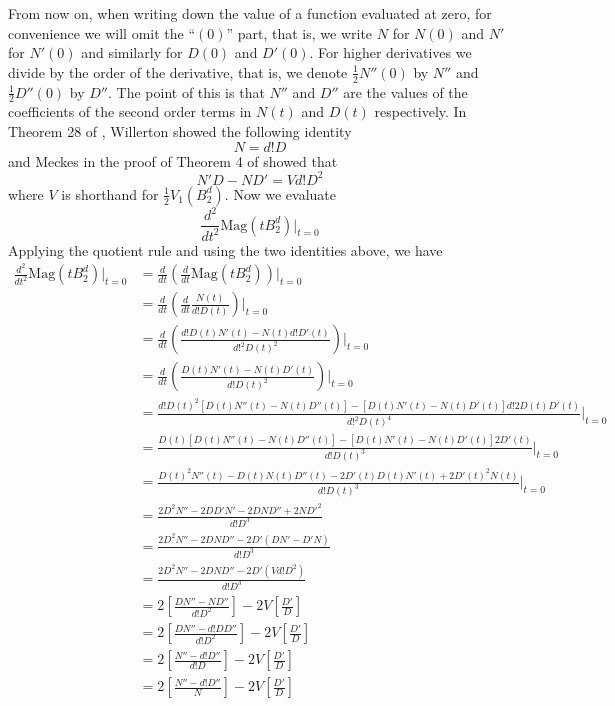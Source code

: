 \documentclass[11pt]{article}
\theoremstyle{definition}
\theoremstyle{definition}
\theoremstyle{plain}
\theoremstyle{plain}
\theoremstyle{plain}
\theoremstyle{definition}
\begin{document}
From now on, when writing down the value of a function evaluated at zero, for convenience we will omit the ``$(0)$'' part, that is, we write $N$ for $N(0)$ and $N'$ for $N'(0)$ and similarly for $D(0)$ and $D'(0)$. For higher derivatives we divide by the order of the derivative, that is, we denote $\frac{1}{2}N''(0)$ by $N''$ and $\frac{1}{2}D''(0)$ by $D''$. The point of this is that $N''$ and $D''$ are the values of the coefficients of the second order terms in $N(t)$ and $D(t)$ respectively. In Theorem 28 of \cite{willerton_magnitude_2017}, Willerton showed the following identity
\begin{equation*}
N = d!D
\end{equation*}
and Meckes in the proof of Theorem 4 of \cite{meckes_magnitude_2019} showed that
\begin{equation*}
N'D - ND' = Vd!D^2
\end{equation*}
where $V$ is shorthand for $\frac{1}{2}V_1\left(B_2^d\right)$. Now we evaluate
\begin{equation*}
\frac{d^2}{dt^2}\text{Mag}(tB_2^d)\big\vert_{t=0}
\end{equation*}
Applying the quotient rule and using the two identities above, we have
\begin{align*}
\frac{d^2}{dt^2}\text{Mag}(tB_2^d)\big\vert_{t=0} &= \frac{d}{dt}\left(\frac{d}{dt}\text{Mag}(tB_2^d)\right)\big\vert_{t=0} \\
&= \frac{d}{dt}\left(\frac{d}{dt}\frac{N(t)}{d!D(t)}\right)\big\vert_{t=0} \\
&= \frac{d}{dt}\left(\frac{d!D(t)N'(t)-N(t)d!D'(t)}{d!^2D(t)^2}\right)\big\vert_{t=0} \\
&= \frac{d}{dt}\left(\frac{D(t)N'(t)-N(t)D'(t)}{d!D(t)^2}\right)\big\vert_{t=0} \\
&= \frac{d!D(t)^2[D(t)N''(t)-N(t)D''(t)]-[D(t)N'(t)-N(t)D'(t)]d!2D(t)D'(t)}{d!^2D(t)^4}\big\vert_{t=0} \\
&= \frac{D(t)[D(t)N''(t)-N(t)D''(t)]-[D(t)N'(t)-N(t)D'(t)]2D'(t)}{d!D(t)^3}\big\vert_{t=0} \\
&= \frac{D(t)^2N''(t)-D(t)N(t)D''(t)-2D'(t)D(t)N'(t)+2D'(t)^2N(t)}{d!D(t)^3}\big\vert_{t=0} \\
&= \frac{2D^2N''-2DD'N'-2DND''+2ND'^2}{d!D^3} \\
&= \frac{2D^2N''-2DND''-2D'(DN'-D'N)}{d!D^3} \\
&= \frac{2D^2N''-2DND''-2D'(Vd!D^2)}{d!D^3} \\
&= 2\left[\frac{DN''-ND''}{d!D^2}\right]-2V\left[\frac{D'}{D}\right] \\
&= 2\left[\frac{DN''-d!DD''}{d!D^2}\right] - 2V\left[\frac{D'}{D}\right] \\
&= 2\left[\frac{N''-d!D''}{d!D}\right] - 2V\left[\frac{D'}{D}\right] \\
&= 2\left[\frac{N''-d!D''}{N}\right] - 2V\left[\frac{D'}{D}\right]
\end{align*}
\end{document}
